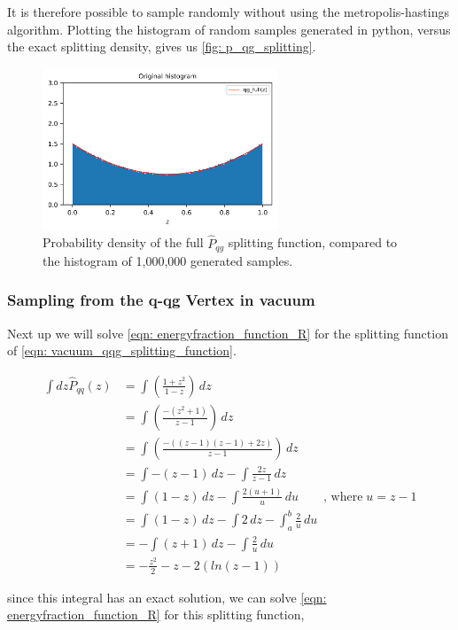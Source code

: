 \documentclass[main.tex]{subfiles}
\begin{document}
It is therefore possible to sample randomly without using the metropolis-hastings algorithm. Plotting the histogram of random samples generated in python, versus the exact splitting density, gives us \autoref{fig: p_qg_splitting}.

\begin{figure}[ht]
    \centering
    \includegraphics[width=7cm]{pictures/MH_plots/MH_vacuum_qg.png}
    \caption{Probability density of the full \(\hat{P}_{qg}\) splitting function, compared to the histogram of 1,000,000 generated samples.}
    \label{fig: p_qg_splitting}
\end{figure}


\subsubsection{Sampling from the q-qg Vertex in vacuum}
Next up we will solve \autoref{eqn: energyfraction_function_R} for the \qqg splitting function of \autoref{eqn: vacuum_qqg_splitting_function}.

\begin{align}
    \int dz\hat{P}_{qq}(z) &= \int \left(\frac{1+z^2}{1-z} \right)\, dz \nonumber \\
    &= \int \left(\frac{-(z^2+1)}{z-1} \right)\, dz \nonumber \\
    &= \int \left(\frac{-((z-1)(z-1)+2z)}{z-1} \right)\, dz \nonumber \\
    &= \int -(z-1)\, dz - \int \frac{2z}{z-1} \, dz \nonumber \\
    &= \int (1-z) \, dz - \int \frac{2(u+1)}{u} \, du \qquad \text{, where}\; u=z-1 \nonumber \\
    &= \int (1-z) \, dz - \int 2\, dz - \int_a^b \frac{2}{u} \, du \nonumber  \\
    &= -\int (z+1) \, dz - \int \frac{2}{u} \, du \nonumber  \\
    &= -\frac{z^2}{2} - z - 2\left( ln(z-1)\right) 
\end{align}

since this integral has an exact solution, we can solve \autoref{eqn: energyfraction_function_R} for this splitting function,
\end{document}
